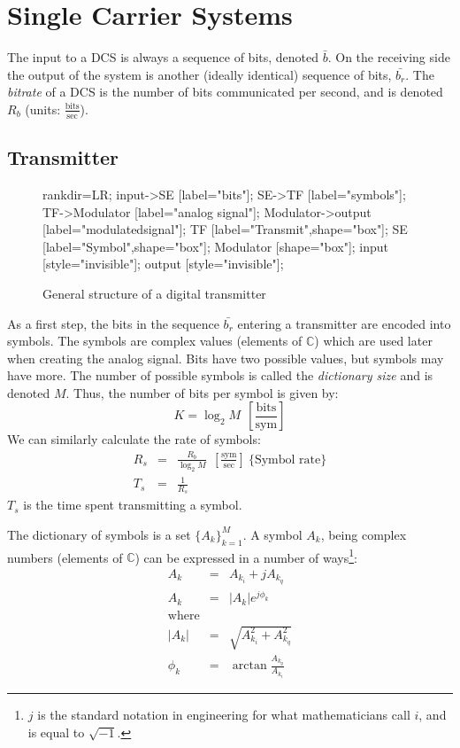 \documentclass[onecolumn,x11names,technote,twoside,a4paper,12pt,english]{IEEEtran}
\begin{document}
\section{Single Carrier Systems}
\label{sec:single-carrier}

The input to a DCS is always a sequence of bits, denoted $\bar{b}$. On the receiving side the output of the system is another (ideally identical) sequence of bits, $\bar{b_r}$. The \emph{bitrate} of a DCS is the number of bits communicated per second, and is denoted $R_b$ (units: $\frac{\text{bits}}{\text{sec}}$).

\subsection{Transmitter}
\label{sec:sc-trans}

\begin{figure}[h!]
  \centering
  \begin{dotpic}[width=5in]
    rankdir=LR; 
    input->SE [label="bits"];
    SE->TF [label="symbols"];
    TF->Modulator [label="analog signal"];
    Modulator->output [label="modulated\nanalog signal"];
    TF [label="Transmit\nFilter",shape="box"];
    SE [label="Symbol\nEncoder",shape="box"];
    Modulator [shape="box"];
    input [style="invisible"];
    output [style="invisible"];
  \end{dotpic}
  \caption{General structure of a digital transmitter}
  \label{fig:DCS-Trans}
\end{figure}

As a first step, the bits in the sequence $\bar{b_r}$ entering a transmitter are encoded into symbols. The symbols are complex values (elements of $\mathbb{C}$) which are used later when creating the analog signal. Bits have two possible values, but symbols may have more. The number of possible symbols is called the \emph{dictionary size} and is denoted $M$. Thus, the number of bits per symbol is given by:
\begin{equation*}
  K = \log_2{M}\ \ \left[\frac{\text{bits}}{\text{sym}}\right]
\end{equation*}
We can similarly calculate the rate of symbols:
\begin{eqnarray*}
R_s &=& \frac{R_b}{\log_2{M}}\ \ \left[\frac{\text{sym}}{\text{sec}}\right]\ \{\text{Symbol rate}\} \\
T_s &=& \frac{1}{R_s}
\end{eqnarray*}
$T_s$ is the time spent transmitting a symbol. 

The dictionary of symbols is a set $\{A_k\}_{k=1}^M$. A symbol $A_k$, being complex numbers (elements of $\mathbb{C}$) can be expressed in a number of ways\footnote{$j$ is the standard notation in engineering for what mathematicians call $i$, and is equal to $\sqrt{-1}$.}:
\begin{eqnarray*}
  A_k &=& A_{k_i} + j A_{k_q} \\
  A_k &=& |A_k|e^{j\phi_k} \\
  \text{where} \\
  |A_k| &=& \sqrt{A_{k_i}^2 + A_{k_q}^2} \\
  \phi_k &=& \arctan{\frac{A_{k_q}}{A_{k_i}}}
\end{eqnarray*}
\end{document}
